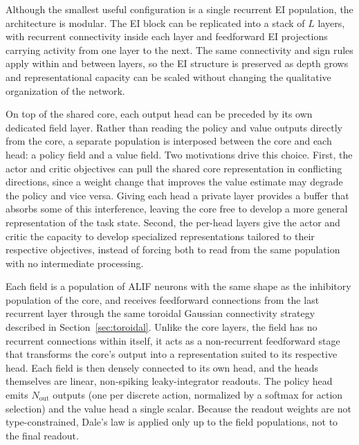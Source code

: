 Although the smallest useful configuration is a single recurrent EI population, the
architecture is modular. The EI block can be replicated into a stack of $L$ layers,
with recurrent connectivity inside each layer and feedforward EI projections carrying
activity from one layer to the next. The same connectivity and sign rules apply within
and between layers, so the EI structure is preserved as depth grows and representational
capacity can be scaled without changing the qualitative organization of the network.

On top of the shared core, each output head can be preceded by its own dedicated field
layer. Rather than reading the policy and value outputs directly from the core, a
separate population is interposed between the core and each head: a policy field and a
value field. Two motivations drive this choice. First, the actor and critic objectives
can pull the shared core representation in conflicting directions, since a weight change
that improves the value estimate may degrade the policy and vice versa. Giving each
head a private layer provides a buffer that absorbs some of this interference, leaving
the core free to develop a more general representation of the task state. Second, the
per-head layers give the actor and critic the capacity to develop specialized
representations tailored to their respective objectives, instead of forcing both to
read from the same population with no intermediate processing.

Each field is a population of ALIF neurons with the same shape as the inhibitory
population of the core, and receives feedforward connections from the last recurrent
layer through the same toroidal Gaussian connectivity strategy described in
Section~\ref{sec:toroidal}. Unlike the core layers, the field has no
recurrent connections within itself, it acts as a non-recurrent feedforward stage that
transforms the core's output into a representation suited to its respective head. Each
field is then densely connected to its own head, and the heads themselves are linear,
non-spiking leaky-integrator readouts. The policy head emits $N_\text{out}$
outputs (one per discrete action, normalized by a softmax for action selection) and
the value head a single scalar. Because the readout weights are not type-constrained,
Dale's law is applied only up to the field populations, not to the final readout.

